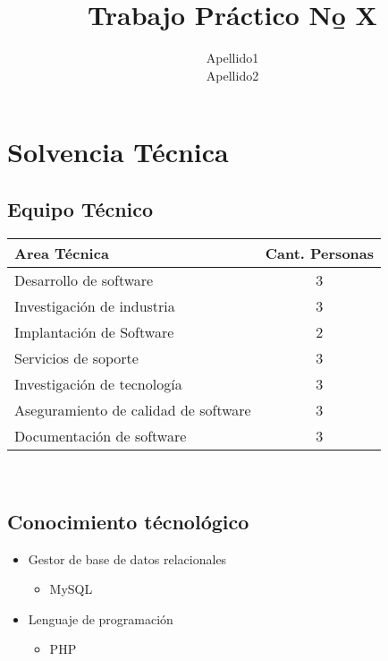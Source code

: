 \documentclass[12pt]{article}
\title{Trabajo Práctico N\b o X}
\author{Apellido1\\Apellido2}
\numberwithin{equation}{section}
\numberwithin{figure}{section}
\numberwithin{table}{section}
\begin{document}
%
%
\pagestyle{fancy}
\renewcommand{\sectionmark}[1]{\markboth{}{\thesection\ \ #1}}
\lhead{}
\chead{}
\rhead{\rightmark}
\lfoot{}
\cfoot{}
\rfoot{\thepage}

%
%
%
%
\setcounter{page}{1}

%
%

%
%

\section{Solvencia T\'ecnica}

\subsection{Equipo T\'ecnico}

\begin{tabular}{| l | c |}
\hline
Area T\'ecnica & Cant. Personas   \\
\hline
Desarrollo de software & 3 \\
\hline
Investigaci\'on de industria & 3\\
\hline
Implantaci\'on de Software & 2 \\
\hline
Servicios de soporte & 3 \\
\hline
Investigaci\'on de tecnolog\'ia & 3\\
\hline
Aseguramiento de calidad de software & 3\\
\hline
Documentaci\'on de software & 3\\
\hline
\end{tabular} \\

\subsection{Conocimiento t\'ecnol\'ogico}
\begin{itemize}
\item Gestor de base de datos relacionales
\begin{itemize}
\item MySQL
\end{itemize} 
\end{itemize}
\begin{itemize}
\item Lenguaje de programaci\'on 
\begin{itemize}
\item PHP
\end{itemize} 
\end{itemize}
\end{document}
